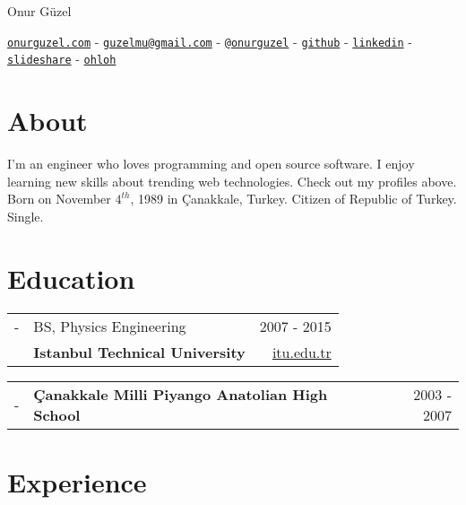 \documentclass[11pt,a4paper]{article}
\author{\name}
\title{\cv}
\def\name{Onur Güzel}
\renewenvironment{itemize}{
  \begin{list}{}{
    \setlength{\leftmargin}{0em}
  }
}{
  \end{list}
}
\begin{document}

\begin{flushright}
\Huge \name
\end{flushright}

\begin{center}
\href{http://www.onurguzel.com/}{\tt onurguzel.com} - 
\href{mailto:guzelmu@gmail.com}{\tt guzelmu@gmail.com} - 
\href{http://onurguzel.com/twitter}{\tt @onurguzel} - 
\href{http://onurguzel.com/github}{\tt github} - 
\href{http://linkedin.com/in/guzelmu}{\tt linkedin} - 
\href{http://www.slideshare.net/onurguzel}{\tt slideshare} - 
\href{http://www.ohloh.net/accounts/onurguzel}{\tt ohloh}
\end{center}

\section*{About}
I'm an engineer who loves programming and open source software. I enjoy learning new skills about trending web technologies. Check out my profiles above.\\[10pt]
Born on November $4^{th}$, 1989 in Çanakkale, Turkey. Citizen of Republic of Turkey. Single.

\section*{Education}
\begin{itemize}
\item
\begin{tabularx}{\textwidth}{ l X r }
- & BS, Physics Engineering & 2007 - 2015 \\
& \textbf{Istanbul Technical University} & \href{http://www.itu.edu.tr/en/}{itu.edu.tr}
\end{tabularx}
\item
\begin{tabularx}{\textwidth}{l X r}
- & \textbf{Çanakkale Milli Piyango Anatolian High School} & 2003 - 2007
\end{tabularx}
\end{itemize}

\section*{Experience}
\end{document}
